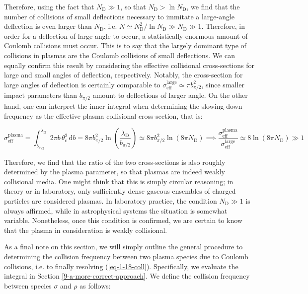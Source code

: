 Therefore, using the fact that $N_{\mathrm{D}}\gg1$, so that $N_{\mathrm{D}}>\ln{N_{\mathrm{D}}}$, we find that the number of collisions of small deflections necessary to immitate a large-angle deflection is even larger than $N_{\mathrm{D}}$, i.e. $N\simeq N_{\mathrm{D}}^2/\ln{N_{\mathrm{D}}}\gg N_{\mathrm{D}}\gg1$. Therefore, in order for a deflection of large angle to occur, a statistically enormous amount of Coulomb collisions must occur. This is to say that the largely dominant type of collisions in plasmas are the Coulomb collisions of small deflections. We can equally confirm this result by considering the effective collisional cross-sections for large and small angles of deflection, respectively. Notably, the cross-section for large angles of deflection is certainly comparable to $\sigma_{\mathrm{eff}}^{\mathrm{large}}\simeq \pi b_{\pi/2}^2$, since smaller impact parameters than $b_{\pi/2}$ amount to deflections of larger angle. On the other hand, one can interpret the inner integral when determining the slowing-down frequency as the effective plasma collisional cross-section, that is:

\begin{equation*}
    \sigma_{\mathrm{eff}}^{\mathrm{plasma}}=\int_{b_{\pi/2}}^{\lambda_{\mathrm{D}}}2\pi b\,\theta_c^2\,\mathrm{d}b=8\pi b_{\pi/2}^2\ln{\left(\frac{\lambda_{\mathrm{D}}}{b_{\pi/2}}\right)}\simeq 8\pi b_{\pi/2}^2\ln{\left(8\pi N_{\mathrm{D}}\right)}\implies \frac{\sigma_{\mathrm{eff}}^{\mathrm{plasma}}}{\sigma_{\mathrm{eff}}^{\mathrm{large}}}\simeq 8\ln{\left(8\pi N_{\mathrm{D}}\right)}\gg1
\end{equation*}

Therefore, we find that the ratio of the two cross-sections is also roughly determined by the plasma parameter, so that plasmas are indeed weakly collisional media. One might think that this is simply circular reasoning; in theory or in laboratory, only sufficiently dense gaseous ensembles of charged particles are considered plasmas. In laboratory practice, the condition $N_{\mathrm{D}}\gg1$ is always affirmed, while in astrophysical systems the situation is somewhat variable. Nonetheless, once this condition is confirmed, we are certain to know that the plasma in consideration is weakly collisional.

\vspace*{2.5pt}

\quad As a final note on this section, we will simply outline the general procedure to determining the collision frequency between two plasma species due to Coulomb collisions, i.e. to finally resolving (\ref{eq-1-18-coll}). Specifically, we evaluate the integral in Section \ref{9-a-more-correct-approach}. We define the collision frequency between species $\sigma$ and $\rho$ as follows:

